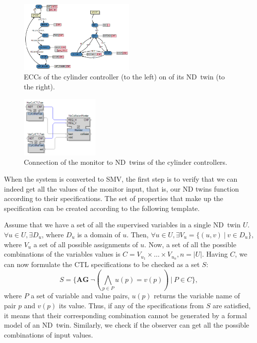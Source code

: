 \begin{bibunit}
\begin{figure}[t]
    \centering
    \includegraphics[width=0.5\textwidth]{MX_Papers/Paper3/pic/ndtcontrollereccs.png}
    \caption{ECCs of the cylinder controller (to the left) on of its ND~twin (to the right).}
    \label{fig:ndtwinecc}
\end{figure}

\begin{figure}[b]
    \centering
    \includegraphics[width=0.34\textwidth]{MX_Papers/Paper3/pic/ndtwinloop.png}
    \caption{Connection of the monitor to ND~twins of the cylinder controllers.}
    \label{fig:ndtwinloop}
\end{figure}

When the system is converted to SMV, the first step is to verify that we can indeed get all the values of the monitor input, that is, our ND twins function according to their specifications. The set of properties that make up the specification can be created according to the following template. 

Assume that we have a set of all the supervised variables in a single ND~twin $U$.
$\forall u \in U, \exists D_u$, where $D_u$ is a domain of $u$. Then, $\forall u \in U, \exists V_u = \{(u,v) \:|\: v \in D_u\}$, where $V_u$ a set of all possible assignments of $u$. Now, a set of all the possible combinations of the variables values is $C = V_{u_1}\times\ldots\times V_{u_n}, n = |U|$. Having $C$, we can now formulate the CTL specifications to be checked as a set $S$:
$$S = \{\textbf{AG} \:\neg(\bigwedge_{p \in P} u(p) = v(p)) \:|\: P \in C\},$$
where $P$ a set of variable and value pairs, $u(p)$ returns the variable name of pair $p$ and $v(p)$ its value. Thus, if any of the specifications from $S$ are satisfied, it means that their corresponding combination cannot be generated by a formal model of an ND~twin.
Similarly, we check if the observer can get all the possible combinations of input values.


\end{bibunit}
